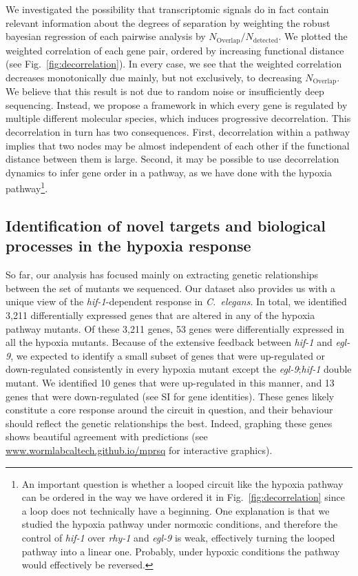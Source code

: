 \documentclass[9pt,twocolumn,twoside]{pnas-new}
\newcommand{\cel}{\emph{C.~elegans}}
\newcommand{\egl}{\emph{egl-9}}
\newcommand{\rhy}{\emph{rhy-1}}
\newcommand{\hif}{\emph{hif-1}}
\newcommand{\total}{3,211}
\newcommand{\inall}{53}
\newcommand{\allup}{10}
\newcommand{\alldown}{13}
\begin{document}
We investigated the possibility that transcriptomic signals do in fact contain relevant information about the degrees of separation by weighting the robust bayesian regression of each pairwise analysis by $N_\mathrm{Overlap}/N_{\mathrm{detected}}$. We plotted the weighted correlation of each gene pair, ordered by increasing functional distance (see Fig.~\ref{fig:decorrelation}). In every case, we see that the weighted correlation decreases monotonically due mainly, but not exclusively, to decreasing $N_\mathrm{Overlap}$.
We believe that this result is not due to random noise or insufficiently deep sequencing. Instead, we propose a framework in which every gene is regulated by multiple different molecular species, which induces progressive decorrelation.
This decorrelation in turn has two consequences. First, decorrelation within a pathway implies that two nodes may be almost independent of each other if the functional distance between them is large. Second, it may be possible to use decorrelation dynamics to infer gene order in a pathway, as we have done with the hypoxia pathway\footnote{An important question is whether a looped circuit like the hypoxia pathway can be ordered in the way we have ordered it in Fig.~\ref{fig:decorrelation} since a loop does not technically have a beginning. One explanation is that we studied the hypoxia pathway under normoxic conditions, and therefore the control of \hif{} over \rhy{} and \egl{} is weak, effectively turning the looped pathway into a linear one. Probably, under hypoxic conditions the pathway would effectively be reversed.
}.

\subsection{Identification of novel targets and biological processes in the hypoxia response}
\label{sub:new_biology}
So far, our analysis has focused mainly on extracting genetic relationships between the set of mutants we sequenced. Our dataset also provides us with a unique view of the \hif{}-dependent response in \cel{}. In total, we identified \total{} differentially expressed genes that are altered in any of the hypoxia pathway mutants. Of these \total{} genes, \inall{} genes were differentially expressed in all the hypoxia mutants. Because of the extensive feedback between \hif{} and \egl{}, we expected to identify a small subset of genes that were up-regulated or down-regulated consistently in every hypoxia mutant except the \egl{};\hif{} double mutant.
We identified \allup{} genes that were up-regulated in this manner, and \alldown{} genes that were down-regulated (see SI for gene identities). These genes likely constitute a core response around the circuit in question, and their behaviour should reflect the genetic relationships the best. Indeed, graphing these genes shows beautiful agreement with predictions (see \url{www.wormlabcaltech.github.io/mprsq} for interactive graphics).
\end{document}
